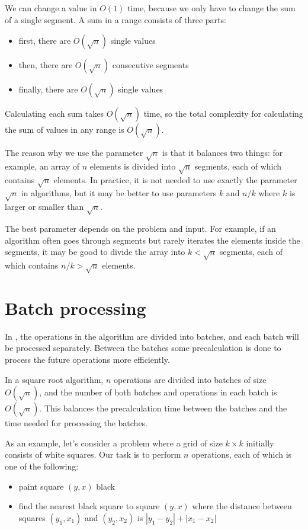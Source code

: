 We can change a value in $O(1)$ time,
because we only have to change the sum of a single segment.
A sum in a range consists of three parts:

\begin{itemize}
\item first, there are $O(\sqrt n)$ single values
\item then, there are $O(\sqrt n)$ consecutive segments
\item finally, there are $O(\sqrt n)$ single values
\end{itemize}

Calculating each sum takes $O(\sqrt n)$ time,
so the total complexity for calculating the sum
of values in any range is $O(\sqrt n)$.

The reason why we use the parameter $\sqrt n$ is that
it balances two things:
for example, an array of $n$ elements is divided
into $\sqrt n$ segments, each of which contains
$\sqrt n$ elements.
In practice, it is not needed to use exactly
the parameter $\sqrt n$ in algorithms, but it may be better to
use parameters $k$ and $n/k$ where $k$ is
larger or smaller than $\sqrt n$.

The best parameter depends on the problem
and input.
For example, if an algorithm often goes through
segments but rarely iterates the elements inside
the segments, it may be good to divide the array into
$k < \sqrt n$ segments, each of which contains $n/k > \sqrt n$
elements.

\section{Batch processing}


In , the operations in the
algorithm are divided into batches,
and each batch will be processed separately.
Between the batches some precalculation is done
to process the future operations more efficiently.

In a square root algorithm, $n$ operations are
divided into batches of size $O(\sqrt n)$,
and the number of both batches and operations in each
batch is $O(\sqrt n)$.
This balances the precalculation time between
the batches and the time needed for processing
the batches.

As an example, let's consider a problem
where a grid of size $k \times k$
initially consists of white squares.
Our task is to perform $n$ operations,
each of which is one of the following:
\begin{itemize}
\item
paint square $(y,x)$ black
\item
find the nearest black square to
square $(y,x)$ where the distance
between squares $(y_1,x_1)$ and $(y_2,x_2)$
is $|y_1-y_2|+|x_1-x_2|$
\end{itemize}

